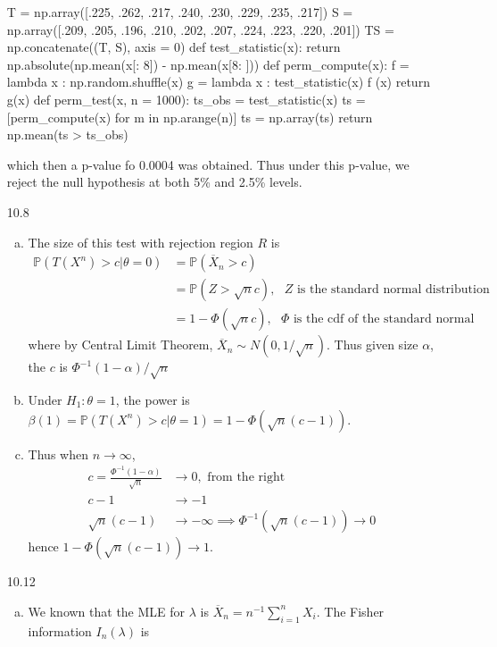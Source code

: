 \documentclass[a4paper,10pt]{article}
\theoremstyle{definition}
\begin{document}
\begin{enumerate}
\begin{python}
T = np.array([.225, .262, .217, .240, .230, .229, .235, .217])
S = np.array([.209, .205, .196, .210, .202, .207, .224, .223, .220, .201])
TS = np.concatenate((T, S), axis = 0)
def test_statistic(x):
    return np.absolute(np.mean(x[: 8]) - np.mean(x[8: ]))
def perm_compute(x):
    f = lambda x : np.random.shuffle(x)
    g = lambda x : test_statistic(x)
    f (x)
    return g(x)
def perm_test(x, n = 1000):
    ts_obs = test_statistic(x)
    ts = [perm_compute(x) for m in np.arange(n)]
    ts = np.array(ts)
    return np.mean(ts > ts_obs)
\end{python}
which then a p-value fo 0.0004 was obtained. Thus under this p-value, we reject the null hypothesis at both 5\% and 2.5\% levels.


\item[10.8]
\begin{enumerate}[(a)]
\item The size of this test with rejection region $R$ is
\begin{align*}
\mathbb{P}(T(X^n)>c| \theta = 0) & = \mathbb{P}(\overline{X}_n > c)\\
& = \mathbb{P}\left(Z > \sqrt{n}c\right), \text{ $Z$ is the standard normal distribution}\\
&= 1- \Phi(\sqrt{n}c), \text{ $\Phi$ is the cdf of the standard normal}
\end{align*}
where by Central Limit Theorem, $\overline{X}_n\sim N(0,1/\sqrt{n})$. Thus given size $\alpha$, the $c$ is $\Phi^{-1}(1-\alpha)/\sqrt{n}$
\item Under $H_1: \theta = 1$, the power is $\beta(1) = \mathbb{P}(T(X^n)>c| \theta = 1) = 1- \Phi\left(\sqrt{n}(c-1)\right)$. 
\item Thus when $n \to \infty$, 
\begin{align*}
c = \frac{\Phi^{-1}(1-\alpha)}{\sqrt{n}} &\to 0, \text{ from the right} \\
c-1&\to -1\\
\sqrt{n}(c-1)&\to -\infty \implies \Phi^{-1}(\sqrt{n}(c-1))\to 0
\end{align*}
hence $1- \Phi\left(\sqrt{n}(c-1)\right) \to 1$.
\end{enumerate}
\item[10.12]
\begin{enumerate}[(a)]
\item We known that the {\sffamily MLE} for $\lambda$ is $\overline{X}_n = n^{-1}\sum_{i=1}^{n}X_i$. The Fisher information $I_n(\lambda)$ is 
\begin{align*}

\end{align*}
\end{enumerate}
\end{enumerate}
\end{document}
